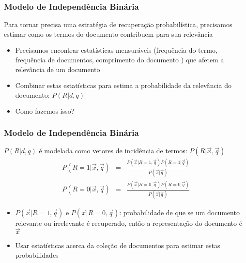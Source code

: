 \documentclass[compress]{beamer}
\begin{document}
\begin{frame}[<+->]
\frametitle{Modelo de Independência Binária}
\pause[2]

Para tornar precisa uma estratégia de recuperação probabilística, precisamos estimar como os termos do documento contribuem para sua relevância
\begin{itemize}

\item Precisamos encontrar estatísticas mensuráveis (frequência do termo, frequência de documentos, comprimento do documento ) que afetem a relevância de um documento

\item Combinar estas estatísticas para estima a probabilidade da relevância do documento: $P(R|d,q)$ 

\item Como fazemos isso?

\end{itemize}
\end{frame}
\begin{frame}[<+->]
\frametitle{Modelo de Independência Binária}
\pause[2]

 $P(R|d,q)$  é modelada como vetores de incidência de termos: $P(R|\vec{x}, \vec{q})$
\begin{eqnarray}
\nonumber
P(R=1|\vec{x}, \vec{q}) &=& \frac{P(\vec{x}|R=1, \vec{q})P(R=1|\vec{q})}{P(\vec{x}|\vec{q})} \label{Rxq-bayes} \\
P(R=0|\vec{x}, \vec{q}) &=& \frac{P(\vec{x}|R=0, \vec{q})P(R=0|\vec{q})}{P(\vec{x}|\vec{q})} \nonumber
\end{eqnarray}
\begin{itemize}

\item $P(\vec{x}|R=1,\vec{q})$ e $P(\vec{x}|R=0,\vec{q})$: probabilidade de que se um documento relevante ou irrelevante é recuperado, então a representação do documento é $\vec{x}$
\item Usar estatísticas acerca da coleção de documentos para estimar estas probabilidades
\end{itemize}
\end{frame}
\end{document}
